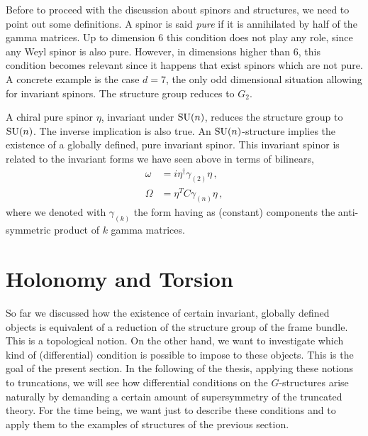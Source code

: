 \documentclass[debug]{phd}
\begin{document}
						Before to proceed with the discussion about spinors and structures, we need to point out some definitions.
						A spinor is said \emph{pure} if it is annihilated by half of the gamma matrices. Up to dimension $6$ this condition does not play any role, since any Weyl spinor is also pure. 
						However, in dimensions higher than $6$, this condition becomes relevant since it happens that exist spinors which are not pure.
						A concrete example is the case $d=7$, the only odd dimensional situation allowing for invariant spinors.
						The structure group reduces to $G_2$.
						
						A chiral pure spinor $\eta$, invariant under $\mathrm{SU}(n)$, reduces the structure group to $\mathrm{SU}(n)$.
						The inverse implication is also true.
						An $\mathrm{SU}(n)$-structure implies the existence of a globally defined, pure invariant spinor.
						This invariant spinor is related to the invariant forms we have seen above in terms of bilinears,
								\begin{equation}\label{spinorSUn}
									\begin{split}
										\omega &= i \eta^\dagger \gamma_{(2)} \eta\, , \\
										\Omega &= \eta^T C \gamma_{(n)} \eta\, ,
									\end{split}
								\end{equation}
						where we denoted with $\gamma_{(k)}$ the form having as (constant) components the anti-symmetric product of $k$ gamma matrices.
		\section{Holonomy and Torsion}
				So far we discussed how the existence of certain invariant, globally defined objects is equivalent of a reduction of the structure group of the frame bundle.
				This is a topological notion.
				On the other hand, we want to investigate which kind of (differential) condition is possible to impose to these objects.
				This is the goal of the present section.
				In the following of the thesis, applying these notions to truncations, we will see how differential conditions on the $G$-structures arise naturally by demanding a certain amount of supersymmetry of the truncated theory.
				For the time being, we want just to describe these conditions and to apply them to the examples of structures of the previous section.
				
\end{document}
